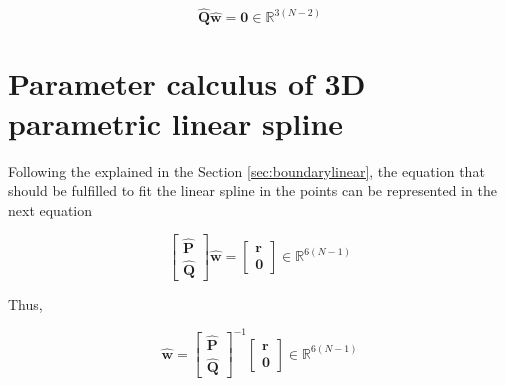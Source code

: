 \begin{equation}
\mathbf{\hat{Q}}
\mathbf{\hat{w}}
=\mathbf{0}\in \mathbb{R}^{3(N-2)}
\end{equation}


\section{Parameter calculus of 3D parametric linear spline}
\label{sec:solvelinearspline}
Following the explained in the Section \ref{sec:boundarylinear},
the equation that should be fulfilled to fit the linear spline in the points can be represented in the next equation

\begin{equation}
\begin{bmatrix}
\mathbf{\hat{P}}\\
\mathbf{\hat{Q}}
\end{bmatrix}
\mathbf{\hat{w}}
=
\begin{bmatrix}
\mathbf{r}\\
\mathbf{0}
\end{bmatrix}
\in \mathbb{R}^{6(N-1)}
\end{equation}

Thus,

\begin{equation}
\mathbf{\hat{w}}
=
\begin{bmatrix}
\mathbf{\hat{P}}\\
\mathbf{\hat{Q}}
\end{bmatrix}^{-1}
\begin{bmatrix}
\mathbf{r}\\
\mathbf{0}
\end{bmatrix}
\in \mathbb{R}^{6(N-1)}
\end{equation}
